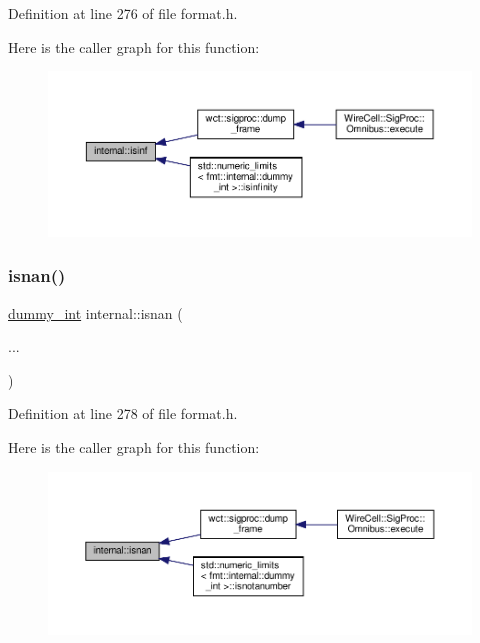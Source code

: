 Definition at line 276 of file format.\+h.

Here is the caller graph for this function\+:
\nopagebreak
\begin{figure}[H]
\begin{center}
\leavevmode
\includegraphics[width=350pt]{namespaceinternal_a39a08170fba78142a8aca3a624c415ee_icgraph}
\end{center}
\end{figure}
\mbox{\label{namespaceinternal_ab13e871d0d819d1bb3b965e2196391cc}} 
\subsubsection{\texorpdfstring{isnan()}{isnan()}}
{\footnotesize\ttfamily \hyperlink{structinternal_1_1dummy__int}{dummy\+\_\+int} internal\+::isnan (\begin{DoxyParamCaption}\item[{}]{... }\end{DoxyParamCaption})\hspace{0.3cm}{\ttfamily [inline]}}



Definition at line 278 of file format.\+h.

Here is the caller graph for this function\+:
\nopagebreak
\begin{figure}[H]
\begin{center}
\leavevmode
\includegraphics[width=350pt]{namespaceinternal_ab13e871d0d819d1bb3b965e2196391cc_icgraph}
\end{center}
\end{figure}
\mbox{\label{namespaceinternal_a6101fd132aee88b9c888cb7e82be20a1}} 
